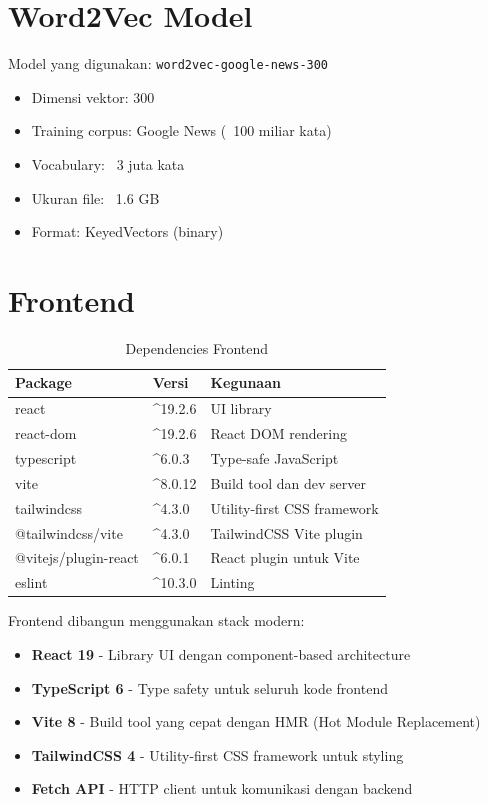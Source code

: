 \documentclass[12pt,a4paper]{report}
\begin{document}
\section{Word2Vec Model}
Model yang digunakan: \texttt{word2vec-google-news-300}
\begin{itemize}
    \item Dimensi vektor: 300
    \item Training corpus: Google News (~100 miliar kata)
    \item Vocabulary: ~3 juta kata
    \item Ukuran file: ~1.6 GB
    \item Format: KeyedVectors (binary)
\end{itemize}

\section{Frontend}
\begin{table}[H]
    \centering
    \begin{tabular}{@{}lll@{}}
        \toprule
        \textbf{Package} & \textbf{Versi} & \textbf{Kegunaan} \\
        \midrule
        react & \textasciicircum 19.2.6 & UI library \\
        react-dom & \textasciicircum 19.2.6 & React DOM rendering \\
        typescript & \textasciicircum 6.0.3 & Type-safe JavaScript \\
        vite & \textasciicircum 8.0.12 & Build tool dan dev server \\
        tailwindcss & \textasciicircum 4.3.0 & Utility-first CSS framework \\
        @tailwindcss/vite & \textasciicircum 4.3.0 & TailwindCSS Vite plugin \\
        @vitejs/plugin-react & \textasciicircum 6.0.1 & React plugin untuk Vite \\
        eslint & \textasciicircum 10.3.0 & Linting \\
        \bottomrule
    \end{tabular}
    \caption{Dependencies Frontend}
\end{table}

Frontend dibangun menggunakan stack modern:
\begin{itemize}
    \item \textbf{React 19} - Library UI dengan component-based architecture
    \item \textbf{TypeScript 6} - Type safety untuk seluruh kode frontend
    \item \textbf{Vite 8} - Build tool yang cepat dengan HMR (Hot Module Replacement)
    \item \textbf{TailwindCSS 4} - Utility-first CSS framework untuk styling
    \item \textbf{Fetch API} - HTTP client untuk komunikasi dengan backend
\end{itemize}
\end{document}
